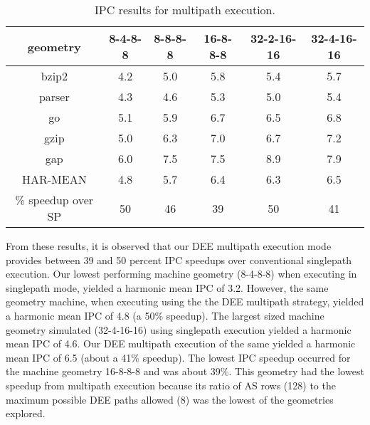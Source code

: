 \documentclass[10pt,twocolumn,dvips]{article}
\begin{document}
\begin{table*}
\scriptsize{
\begin{center}
\caption{IPC results for multipath execution.}
\label{tab:ipc3}
\begin{tabular}{|c|c|c|c|c|c|}
\hline 
geometry&
8-4-8-8&
8-8-8-8&
16-8-8-8&
32-2-16-16&
32-4-16-16\\
\hline 
\hline
bzip2&4.2&5.0&5.8&5.4&5.7\\
\hline 
parser&4.3&4.6&5.3&5.0&5.4\\
\hline 
go&5.1&5.9&6.7&6.5&6.8\\
\hline 
gzip&5.0&6.3&7.0&6.7&7.2\\
\hline 
gap&6.0&7.5&7.5&8.9&7.9\\
\hline 
\hline 
HAR-MEAN&4.8&5.7&6.4&6.3&6.5\\
\hline
\% speedup over SP&50&46&39&50&41\\
\hline
\end{tabular}
\end{center}
}
\end{table*}
%
%
From these results, 
it is observed that our DEE multipath execution mode
provides between 39 and 50 percent IPC speedups over conventional
singlepath execution.
Our lowest performing machine geometry (8-4-8-8) when executing
in singlepath mode, yielded a harmonic mean IPC of 3.2.
However, the same geometry machine, when executing using the
the DEE multipath strategy, yielded a harmonic mean IPC of 4.8 (a
50\% speedup).
The largest sized machine geometry
simulated (32-4-16-16) using singlepath execution yielded 
a harmonic mean IPC of 4.6.  
Our DEE multipath execution of 
the same yielded a harmonic mean IPC of 6.5 (about
a 41\% speedup).  The lowest IPC speedup occurred for the machine 
geometry 16-8-8-8 and was about 39\%.  This geometry had the lowest
speedup from multipath execution because its ratio of AS rows (128)
to the maximum possible DEE paths allowed (8) was the lowest of
the geometries explored.
%
\end{document}
